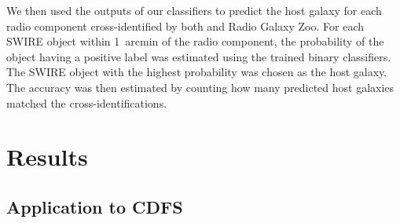 \documentclass[fleqn,usenatbib,usedcolumn]{mnras}
\begin{document}
    We then used the outputs of our classifiers to predict the host galaxy for
    each radio component cross-identified by both \citet{norris06} and Radio
    Galaxy Zoo. For each SWIRE object within 1~arcmin of the radio component,
    the probability of the object having a positive label was estimated using
    the trained binary classifiers. The SWIRE object with the highest
    probability was chosen as the host galaxy. The accuracy was then estimated
    by counting how many predicted host galaxies matched the \citet{norris06}
    cross-identifications.

\section{Results}\label{sec:results}
\subsection{Application to CDFS}
\end{document}
